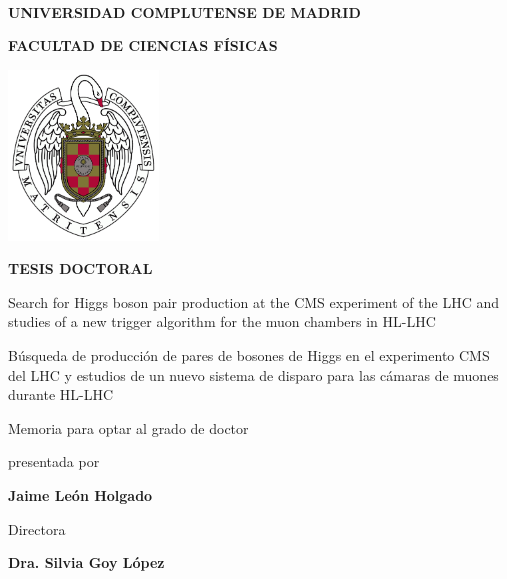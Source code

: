 \documentclass[12pt,a4paper,onehalfspacing]{book}
\begin{document}
\begin{titlepage}
\centering
	~\\
	{\Large \textbf{UNIVERSIDAD COMPLUTENSE DE MADRID }\par}
	\vspace{0.25cm}
	{\large \textbf{FACULTAD DE CIENCIAS FÍSICAS} \par}
	\vspace{1cm}
	\includegraphics[width=0.3\textwidth]{escudo_ucm.png}\par\vspace{1cm}
	{\Large \textbf{TESIS DOCTORAL} \par}
	{\Large Search for Higgs boson pair production at the CMS experiment of the LHC and studies of a new trigger algorithm for the muon chambers in HL-LHC \par}
	\vspace{0.25cm}
	{\Large Búsqueda de producción de pares de bosones de Higgs en el experimento CMS del LHC y estudios de un nuevo sistema de disparo para las cámaras de muones durante HL-LHC \par}
	\vspace{1.5cm}
	{\Large Memoria para optar al grado de doctor \par}
	{\Large presentada por \par}
	{\Large \textbf{Jaime León Holgado} \par}
	\vspace{1cm}
	{\Large Directora \par}
	{\Large \textbf{Dra. Silvia Goy López} \par}
	\vspace{2cm}

\end{titlepage}

%



\newpage

\setlength{\parskip}{0pt}
\tableofcontents
\setlength{\parskip}{2mm}
\end{document}
